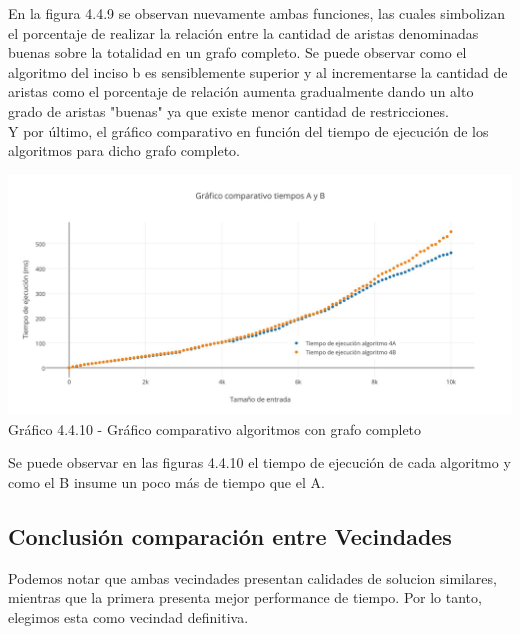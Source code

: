 En la figura 4.4.9 se observan nuevamente ambas funciones, las cuales simbolizan el porcentaje de realizar la relación entre la cantidad de aristas denominadas buenas sobre la totalidad en un grafo completo. Se puede observar como el algoritmo del inciso b es sensiblemente superior y al incrementarse la cantidad de aristas como el porcentaje de relación aumenta gradualmente dando un alto grado de aristas "buenas" ya que existe menor cantidad de restricciones.\\

Y por último, el gráfico comparativo en función del tiempo de ejecución de los algoritmos para dicho grafo completo.

  \vspace*{0.3cm} \vspace*{0.3cm}
  \begin{center}
 \includegraphics[scale=0.28]{./ej4/comcompleto2.jpg}
 	{Gráfico 4.4.10 - Gráfico comparativo algoritmos con grafo completo}
  \end{center}
  \vspace*{0.3cm}
  
 Se puede observar en las figuras 4.4.10 el tiempo de ejecución de cada algoritmo y como el B insume un poco más de tiempo que el A.\\
 
\subsection{Conclusión comparación entre Vecindades}
Podemos notar que ambas vecindades presentan calidades de solucion similares, mientras que la primera presenta mejor performance de tiempo. Por lo tanto, elegimos esta como vecindad definitiva.